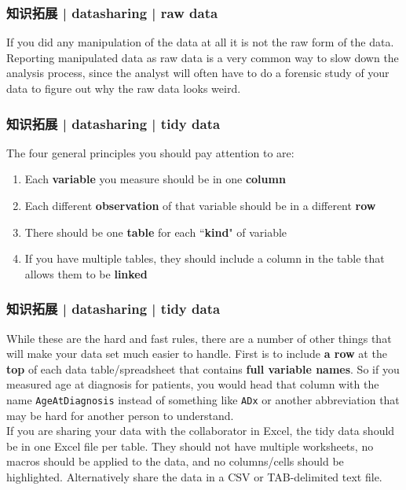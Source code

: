 \begin{frame}
  \frametitle{知识拓展 | datasharing | raw data}
  If you did any manipulation of the data at all it is not the raw form of the data. Reporting manipulated data as raw data is a very common way to slow down the analysis process, since the analyst will often have to do a forensic study of your data to figure out why the raw data looks weird.
\end{frame}

\begin{frame}
  \frametitle{知识拓展 | datasharing | tidy data}
  The four general principles you should pay attention to are:
  \begin{enumerate}
    \item Each \textbf{variable} you measure should be in one \textbf{column}
    \item Each different \textbf{observation} of that variable should be in a different \textbf{row}
    \item There should be one \textbf{table} for each ``\textbf{kind}" of variable
    \item If you have multiple tables, they should include a column in the table that allows them to be \textbf{linked}
  \end{enumerate}
\end{frame}

\begin{frame}[fragile]
  \frametitle{知识拓展 | datasharing | tidy data}
  While these are the hard and fast rules, there are a number of other things that will make your data set much easier to handle. First is to include \textbf{a row} at the \textbf{top} of each data table/spreadsheet that contains \textbf{full variable names}. So if you measured age at diagnosis for patients, you would head that column with the name \verb|AgeAtDiagnosis| instead of something like \verb|ADx| or another abbreviation that may be hard for another person to understand. \\
  \vspace{1em}
  If you are sharing your data with the collaborator in Excel, the tidy data should be in one Excel file per table. They should not have multiple worksheets, no macros should be applied to the data, and no columns/cells should be highlighted. Alternatively share the data in a CSV or TAB-delimited text file.
\end{frame}

